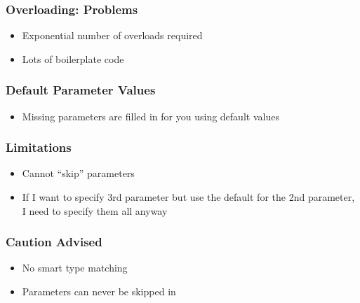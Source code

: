 \begin{frame}
  \frametitle{Overloading: Problems}
  \begin{center}
  \end{center}
  \vskip-5mm
  \begin{itemize}
    \item Exponential number of overloads required
    \item Lots of boilerplate code
  \end{itemize}
\end{frame}

\begin{frame}
  \frametitle{Default Parameter Values}
  \begin{itemize}
    \item Missing parameters are filled in for you using default values
  \end{itemize}
\end{frame}

\begin{frame}
  \frametitle{Limitations}
  \begin{itemize}
    \item Cannot ``skip'' parameters
    \item If I want to specify 3rd parameter but use the default for the 2nd parameter, I need
          to specify them all anyway
  \end{itemize}
\end{frame}

\begin{frame}
  \frametitle{Caution Advised}
  \begin{itemize}
    \item No smart type matching
    \item Parameters can never be skipped in \cpp
  \end{itemize}
\end{frame}

